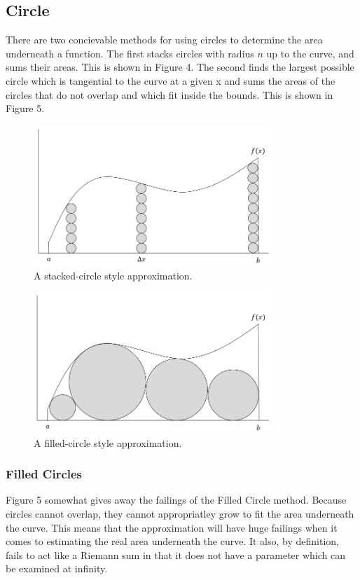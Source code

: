 \documentclass{article}
\begin{document}
    \subsection{Circle}
      There are two concievable methods for using circles to determine the area
      underneath a function. The first stacks circles with radius \( n \) up to
      the curve, and sums their areas. This is shown in Figure 4. The second
      finds the largest possible circle which is tangential to the curve at a given
      x and sums the areas of the circles that do not overlap and which fit inside
      the bounds. This is shown in Figure 5.

      \begin{figure}[h]
        \centering
        \includegraphics[width=0.8\textwidth]{circle_example_1}
        \caption{A stacked-circle style approximation.}
      \end{figure}

      \begin{figure}[h]
        \centering
        \includegraphics[width=0.8\textwidth]{circle_example_2}
        \caption{A filled-circle style approximation.}
      \end{figure}

      \subsubsection{Filled Circles}
        Figure 5 somewhat gives away the failings of the Filled Circle method. Because
        circles cannot overlap, they cannot appropriatley grow to fit the area
        underneath the curve. This means that the approximation will have huge
        failings when it comes to estimating the real area underneath the curve.
        It also, by definition, fails to act like a Riemann sum in that it does not
        have a parameter which can be examined at infinity.
\end{document}
